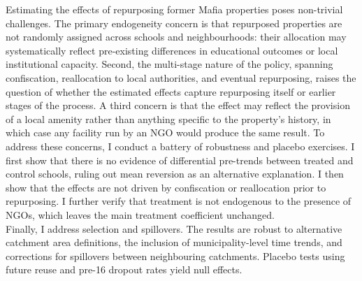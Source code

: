 \documentclass[12pt]{article}
\theoremstyle{plain}
\theoremstyle{plain}
\theoremstyle{plain}
\theoremstyle{definition}
\theoremstyle{plain}
\theoremstyle{definition}
\theoremstyle{plain}
\theoremstyle{remark}
\theoremstyle{definition}
\theoremstyle{definition}
\theoremstyle{plain}
\begin{document}
Estimating the effects of repurposing former Mafia properties poses non-trivial challenges. The primary endogeneity concern is that repurposed properties are not randomly assigned across schools and neighbourhoods: their allocation may systematically reflect pre-existing differences in educational outcomes or local institutional capacity. Second, the multi-stage nature of the policy, spanning confiscation, reallocation to local authorities, and eventual repurposing, raises the question of whether the estimated effects capture repurposing itself or earlier stages of the process. A third concern is that the effect may reflect the provision of a local amenity rather than anything specific to the property's history, in which case any facility run by an NGO would produce the same result. To address these concerns, I conduct a battery of robustness and placebo exercises. I first show that there is no evidence of differential pre-trends between treated and control schools, ruling out mean reversion as an alternative explanation. I then show that the effects are not driven by confiscation or reallocation prior to repurposing. I further verify that treatment is not endogenous to the presence of NGOs, which leaves the main treatment coefficient unchanged. \\
Finally, I address selection and spillovers. The results are robust to alternative catchment area definitions, the inclusion of municipality-level time trends, and corrections for spillovers between neighbouring catchments. Placebo tests using future reuse and pre-16 dropout rates yield null effects. \par
\medskip
\end{document}
